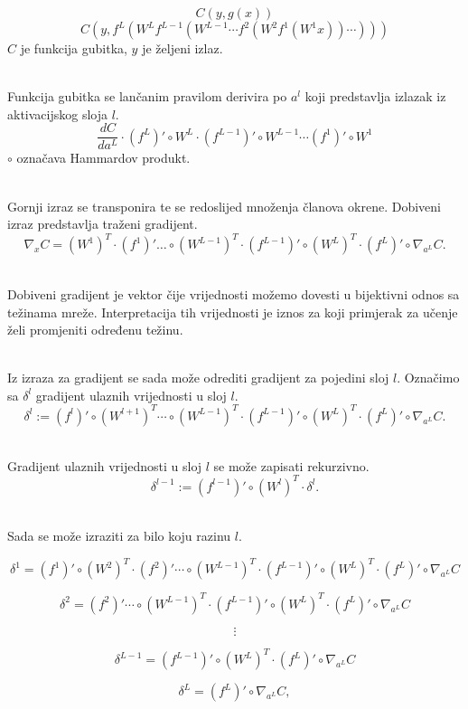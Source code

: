 	\[C(y,g(x))\]
	\[C(y,f^{L}(W^{L}f^{L-1}(W^{L-1}\cdots f^{2}(W^{2}f^{1}(W^{1}x))\cdots )))\]
	\(C\) je funkcija gubitka, \(y\) je željeni izlaz.
	
	\noindent\\Funkcija gubitka se lančanim pravilom derivira po \(a^l\) koji predstavlja izlazak iz aktivacijskog sloja \(l\).
	\[{\frac {dC}{da^{L}}}\cdot (f^{L})'\circ W^{L}\cdot (f^{L-1})'\circ W^{L-1}\cdots (f^{1})'\circ W^{1}\]
	\(\circ\) označava Hammardov produkt.
	
	\noindent\\Gornji izraz se transponira te se redoslijed množenja članova okrene. Dobiveni izraz predstavlja traženi gradijent.
	\[\nabla _{x}C=(W^{1})^{T}\cdot (f^{1})'\ldots \circ (W^{L-1})^{T}\cdot (f^{L-1})'\circ (W^{L})^{T}\cdot (f^{L})'\circ \nabla _{a^{L}}C.\]
	
	\noindent\\Dobiveni gradijent je vektor čije vrijednosti možemo dovesti u bijektivni odnos sa težinama mreže. Interpretacija tih vrijednosti je iznos za koji primjerak za učenje želi promjeniti određenu težinu.
	
	\noindent\\Iz izraza za gradijent se sada može odrediti gradijent za pojedini sloj \(l\). Označimo sa \(\delta ^{l}\) gradijent ulaznih vrijednosti u sloj \(l\). 
	\[\delta ^{l}:=(f^{l})'\circ (W^{l+1})^{T}\cdots \circ (W^{L-1})^{T}\cdot (f^{L-1})'\circ (W^{L})^{T}\cdot (f^{L})'\circ \nabla _{a^{L}}C.\]
	
	\noindent\\Gradijent ulaznih vrijednosti u sloj \(l\) se može zapisati rekurzivno.
	\[\delta ^{l-1}:=(f^{l-1})'\circ (W^{l})^{T}\cdot \delta ^{l}.\]
	
	\noindent\\Sada se može izraziti za bilo koju razinu \(l\).
	
	$$\delta ^{1}=(f^{1})'\circ (W^{2})^{T}\cdot (f^{2})'\cdots \circ (W^{L-1})^{T}\cdot (f^{L-1})'\circ (W^{L})^{T}\cdot (f^{L})'\circ \nabla _{a^{L}}C$$
					
				$$\delta ^{2}=(f^{2})'\cdots \circ (W^{L-1})^{T}\cdot (f^{L-1})'\circ (W^{L})^{T}\cdot (f^{L})'\circ \nabla _{a^{L}}C$$
				
				$$\vdots$$ 
				
				$$\delta ^{L-1}=(f^{L-1})'\circ (W^{L})^{T}\cdot (f^{L})'\circ \nabla _{a^{L}}C$$
				
				$$\delta ^{L}=(f^{L})'\circ \nabla _{a^{L}}C,$$
		
